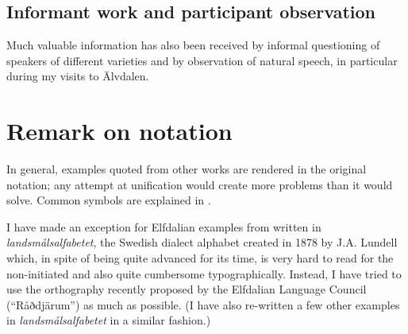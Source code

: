
\subsection{Informant work and participant observation}
Much\textbf{ }valuable information has also been received by informal questioning of speakers of different varieties and by observation of natural speech, in particular during my visits to Älvdalen. 


\section{Remark on notation}

In general, examples quoted from other works are rendered in the original notation; any attempt at unification would create more problems than it would solve. Common symbols are explained in .


I have made an exception for Elfdalian examples from \citet{Levander1909} written in \textit{landsmålsalfabetet}, the Swedish dialect alphabet created in 1878 by J.A. Lundell which, in spite of being quite advanced for its time, is very hard to read for the non-initiated and also quite cumbersome typographically. Instead, I have tried to use the orthography recently proposed by the Elfdalian Language Council (“Råðdjärum”) as much as possible. (I have also re-written a few other examples in \textit{landsmålsalfabetet }in a similar fashion.)

